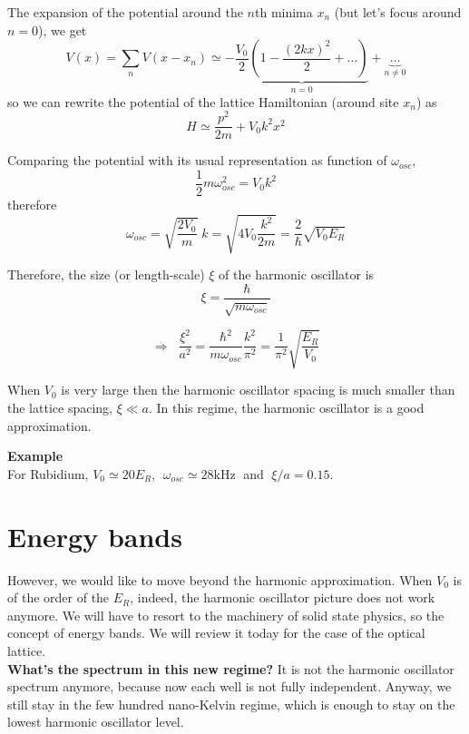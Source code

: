 \begin{center}
\scalebox{1.4}{
    
}
\end{center}


The expansion of the potential around the $n$th minima $x_n$ (but let's focus around $n=0$), we get
\begin{equation*}
    V(x) = \sum_n V(x-x_n) \simeq
    - \underbrace{
        \frac{V_0}{2}\left(
        1 - \frac{(2kx)^2}{2} + \dots
        \right)
    }_{n=0}
    + \underbrace{\dots}_{n\neq 0}
\end{equation*}
so we can rewrite the potential of the lattice Hamiltonian (around site $x_n$) as
\begin{equation*}
    H \simeq \frac{p^2}{2m} + V_0k^2x^2
\end{equation*}

\noindent Comparing the potential with its usual representation as function of $\omega_{osc}$, $$\frac{1}{2}m\omega_{osc}^2 = V_0k^2$$
therefore
$$\omega_{osc} = \sqrt{\frac{2V_0}{m}}\;k = 
\sqrt{4V_0\frac{k^2}{2m}} = \frac{2}{\hbar}\sqrt{V_0E_R}$$

\noindent Therefore, the size (or length-scale) $\xi$ of the harmonic oscillator is
$$\xi = \frac{\hbar}{\sqrt{m\omega_{osc}}}$$

\begin{equation*}
    \Longrightarrow \;\;
    \frac{\xi^2}{a^2} = \frac{\hbar^2}{m\omega_{osc}}\frac{k^2}{\pi^2}=
    \frac{1}{\pi^2}\sqrt{\frac{E_R}{V_0}}
\end{equation*}
    
When $V_0$ is very large then the harmonic oscillator spacing is much smaller than the lattice spacing, $\xi \ll a$. In this regime, the harmonic oscillator is a good approximation.



\begin{tcolorbox}
\textbf{Example}\\

For Rubidium,
$V_0 \simeq 20 E_R$,
$\;\omega_{osc} \simeq 28 \text{kHz}\;$
and $\;\xi/a = 0.15$.
\end{tcolorbox}





\section{Energy bands}


However, we would like to move beyond the harmonic approximation.
When $V_0$ is of the order of the $E_R$, indeed, the harmonic oscillator picture does not work anymore.
We will have to resort to the machinery of solid state physics, so the concept of energy bands. We will review it today for the case of the optical lattice. \\
\textbf{What's the spectrum in this new regime?} It is not the harmonic oscillator spectrum anymore, because now each well is not fully independent. Anyway, we still stay in the few hundred nano-Kelvin regime, which is enough to stay on the lowest harmonic oscillator level.





